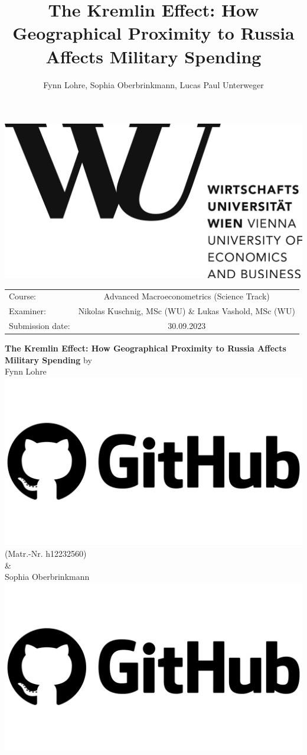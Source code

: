 \documentclass[12pt,a4paper]{article}
\author{Fynn Lohre, Sophia Oberbrinkmann, Lucas Paul Unterweger}
\title{The Kremlin Effect: How Geographical Proximity to Russia Affects Military Spending}
\begin{document}
\begin{titlepage}
\center
\vfill
\includegraphics[scale=0.08]{WU.png}
\vfill
\begin{tabular}[t]{lc}
Course:  & Advanced Macroeconometrics (Science Track) \\
Examiner: & 
Nikolas Kuschnig, MSc (WU) \& Lukas Vashold, MSc (WU) \\
Submission date: & 30.09.2023 \\
\end{tabular}
\vfill
{\large \textbf{The Kremlin Effect: How Geographical Proximity to Russia Affects Military Spending}}
\vfill
by\\ \vspace{3mm}
{\Large Fynn Lohre \href{https://github.com/VARFynn}{\includegraphics[scale=0.01]{GitHub.png}}}\\
(Matr.-Nr. h12232560)\\ \vspace{3mm}
\& \\ \vspace{3mm}
{\Large Sophia Oberbrinkmann \href{https://github.com/SophiaOberbrinkmann}{\includegraphics[scale=0.01]{GitHub.png}}}\\

\end{titlepage}
\end{document}
